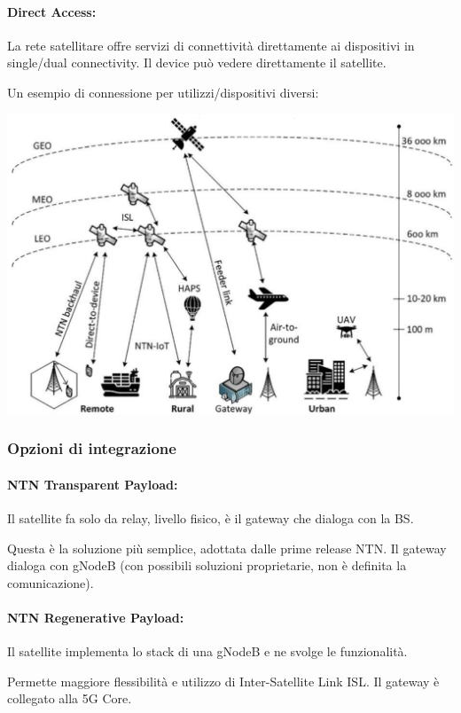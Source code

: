 \paragraph{Direct Access:} La rete satellitare offre servizi di connettività direttamente ai dispositivi in single/dual connectivity. Il device può vedere direttamente il satellite.

Un esempio di connessione per utilizzi/dispositivi diversi:
\begin{center}
	\includegraphics[width=0.98\linewidth]{img/sat/overview}
\end{center}

\subsubsection{Opzioni di integrazione}

\paragraph{NTN Transparent Payload:} Il satellite fa solo da relay, livello fisico, è il gateway che dialoga con la BS.

Questa è la soluzione più semplice, adottata dalle prime release NTN. Il gateway dialoga con gNodeB (con possibili soluzioni proprietarie, non è definita la comunicazione).

\paragraph{NTN Regenerative Payload:} Il satellite implementa lo stack di una gNodeB e ne svolge le funzionalità. 

Permette maggiore flessibilità e utilizzo di Inter-Satellite Link ISL. Il gateway è collegato alla 5G Core. 

